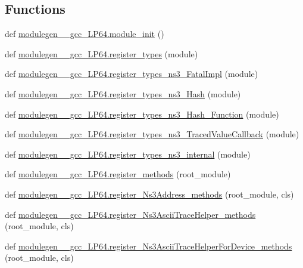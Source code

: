 \subsection*{Functions}
\begin{DoxyCompactItemize}
\item 
def \hyperlink{namespacemodulegen____gcc__LP64_a6fa3bcd89827bb55aea467ffebc10531}{modulegen\+\_\+\+\_\+gcc\+\_\+\+L\+P64.\+module\+\_\+init} ()
\item 
def \hyperlink{namespacemodulegen____gcc__LP64_ab61bb54af74e931fcb41c8f8677a8eb5}{modulegen\+\_\+\+\_\+gcc\+\_\+\+L\+P64.\+register\+\_\+types} (module)
\item 
def \hyperlink{namespacemodulegen____gcc__LP64_a2262e0d4e35e243aa3a1da10a2cb4e41}{modulegen\+\_\+\+\_\+gcc\+\_\+\+L\+P64.\+register\+\_\+types\+\_\+ns3\+\_\+\+Fatal\+Impl} (module)
\item 
def \hyperlink{namespacemodulegen____gcc__LP64_a93555c52620e0de62d76d0946d4554a2}{modulegen\+\_\+\+\_\+gcc\+\_\+\+L\+P64.\+register\+\_\+types\+\_\+ns3\+\_\+\+Hash} (module)
\item 
def \hyperlink{namespacemodulegen____gcc__LP64_a3e77b4168f4d6176242961c3f3cd12f0}{modulegen\+\_\+\+\_\+gcc\+\_\+\+L\+P64.\+register\+\_\+types\+\_\+ns3\+\_\+\+Hash\+\_\+\+Function} (module)
\item 
def \hyperlink{namespacemodulegen____gcc__LP64_a932218c26ce11fb1473ffc3980f37614}{modulegen\+\_\+\+\_\+gcc\+\_\+\+L\+P64.\+register\+\_\+types\+\_\+ns3\+\_\+\+Traced\+Value\+Callback} (module)
\item 
def \hyperlink{namespacemodulegen____gcc__LP64_aa5591cd0831727624dde86d56333dc35}{modulegen\+\_\+\+\_\+gcc\+\_\+\+L\+P64.\+register\+\_\+types\+\_\+ns3\+\_\+internal} (module)
\item 
def \hyperlink{namespacemodulegen____gcc__LP64_a8ac8e0786047c1ed08fed9bc1a45843d}{modulegen\+\_\+\+\_\+gcc\+\_\+\+L\+P64.\+register\+\_\+methods} (root\+\_\+module)
\item 
def \hyperlink{namespacemodulegen____gcc__LP64_a0bc87667cfe5a45fc4aa7c0de2ae51d2}{modulegen\+\_\+\+\_\+gcc\+\_\+\+L\+P64.\+register\+\_\+\+Ns3\+Address\+\_\+methods} (root\+\_\+module, cls)
\item 
def \hyperlink{namespacemodulegen____gcc__LP64_adaa3b88859141e10907c6d889f64e0b2}{modulegen\+\_\+\+\_\+gcc\+\_\+\+L\+P64.\+register\+\_\+\+Ns3\+Ascii\+Trace\+Helper\+\_\+methods} (root\+\_\+module, cls)
\item 
def \hyperlink{namespacemodulegen____gcc__LP64_adda67a3ef2e83d325cf96ae6d4960d43}{modulegen\+\_\+\+\_\+gcc\+\_\+\+L\+P64.\+register\+\_\+\+Ns3\+Ascii\+Trace\+Helper\+For\+Device\+\_\+methods} (root\+\_\+module, cls)

\end{DoxyCompactItemize}
